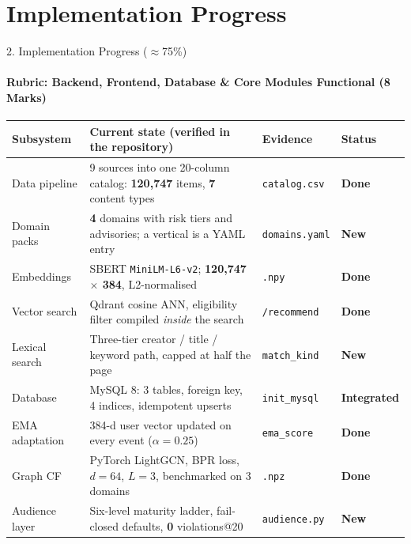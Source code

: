 \documentclass[aspectratio=169, 11pt]{beamer}
\newcommand{\sOK}{\textcolor{amritaTeal}{\textbf{Done}}}
\newcommand{\sINT}{\textcolor{amritaTeal}{\textbf{Integrated}}}
\newcommand{\sNEW}{\textcolor{amritaMaroon}{\textbf{New}}}
\begin{document}
\section{Implementation Progress}

\begin{frame}[shrink]{2. Implementation Progress ($\approx$75\%)}
\framesubtitle{Rubric: Backend, Frontend, Database \& Core Modules Functional (8 Marks)}
\vspace{0.5mm}
\begin{center}
{\tiny
\renewcommand{\arraystretch}{1.38}
\begin{tabular}{p{1.9cm} p{7.5cm} p{1.35cm} l}
\toprule
\textbf{Subsystem} & \textbf{Current state (verified in the repository)} & \textbf{Evidence} & \textbf{Status}\\
\midrule
Data pipeline   & 9 sources into one 20-column catalog: \textbf{120{,}747} items, \textbf{7} content types & \texttt{catalog.csv} & \sOK\\
Domain packs    & \textbf{4} domains with risk tiers and advisories; a vertical is a YAML entry          & \texttt{domains.yaml}& \sNEW\\
Embeddings      & SBERT \texttt{MiniLM-L6-v2}; \textbf{120{,}747 $\times$ 384}, L2-normalised            & \texttt{.npy}        & \sOK\\
Vector search   & Qdrant cosine ANN, eligibility filter compiled \emph{inside} the search                & \texttt{/recommend}  & \sOK\\
Lexical search  & Three-tier creator / title / keyword path, capped at half the page                     & \texttt{match\_kind} & \sNEW\\
Database        & MySQL 8: 3 tables, foreign key, 4 indices, idempotent upserts                          & \texttt{init\_mysql} & \sINT\\
EMA adaptation  & 384-d user vector updated on every event ($\alpha=0.25$)                               & \texttt{ema\_score}  & \sOK\\
Graph CF        & PyTorch LightGCN, BPR loss, $d{=}64$, $L{=}3$, benchmarked on 3 domains                & \texttt{.npz}        & \sOK\\
Audience layer  & Six-level maturity ladder, fail-closed defaults, \textbf{0} violations@20              & \texttt{audience.py} & \sNEW\\

\end{tabular}}
\end{center}
\end{frame}
\end{document}
